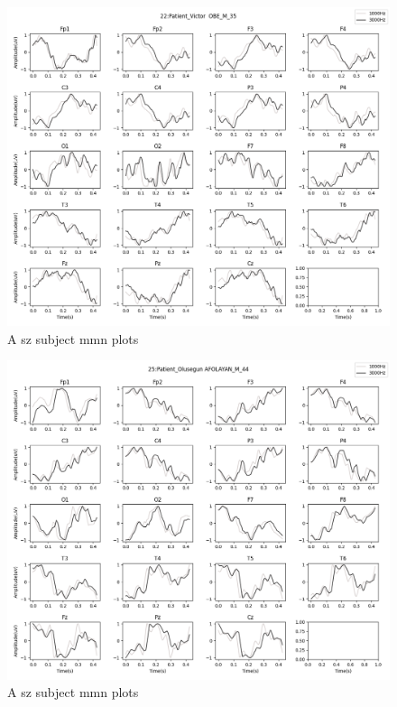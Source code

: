 \documentclass[10pt]{article}
\begin{document}
\begin{figure}[H]
  \includegraphics[width=16cm]{../../../data_analysis_results/MMN/time_series/Patient/22.png}
  \caption{A \gls{sz} subject \gls{mmn} plots}
\end{figure}
\begin{figure}[H]
  \includegraphics[width=16cm]{../../../data_analysis_results/MMN/time_series/Patient/25.png}
  \caption{A \gls{sz} subject \gls{mmn} plots}
\end{figure}

\clearpage
\end{document}
